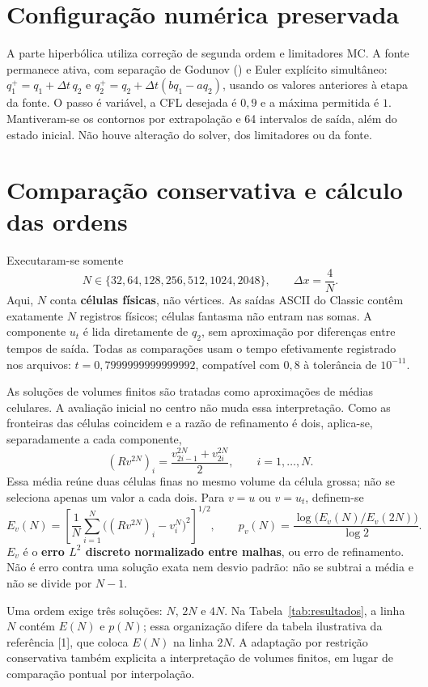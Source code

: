 \documentclass[11pt,a4paper]{article}
\newcommand{\secao}[1]{\section{\texorpdfstring{\color{azul}#1}{#1}}}
\newcommand{\arquivo}[1]{\texttt{\detokenize{#1}}}
\begin{document}
\secao{Configuração numérica preservada}
A parte hiperbólica utiliza correção de segunda ordem e limitadores MC. A fonte
permanece ativa, com separação de Godunov (\arquivo{source_split=1}) e Euler
explícito simultâneo: $q_1^+=q_1+\Delta t\,q_2$ e
$q_2^+=q_2+\Delta t(bq_1-aq_2)$, usando os valores anteriores à etapa da fonte.
O passo é variável, a CFL desejada é $0{,}9$ e a máxima permitida é $1$.
Mantiveram-se os contornos por extrapolação e 64 intervalos de saída, além do
estado inicial. Não houve alteração do solver, dos limitadores ou da fonte.

\newpage
\secao{Comparação conservativa e cálculo das ordens}
Executaram-se somente
\[
 N\in\{32,64,128,256,512,1024,2048\},\qquad \Delta x=\frac{4}{N}.
\]
Aqui, $N$ conta \textbf{células físicas}, não vértices. As saídas ASCII do Classic
contêm exatamente $N$ registros físicos; células fantasma não entram nas somas.
A componente $u_t$ é lida diretamente de $q_2$, sem aproximação por diferenças
entre tempos de saída. Todas as comparações usam o tempo efetivamente registrado
nos arquivos: $t=0{,}7999999999999992$, compatível com $0{,}8$ à tolerância
de $10^{-11}$.

As soluções de volumes finitos são tratadas como aproximações de médias
celulares. A avaliação inicial no centro não muda essa interpretação. Como as
fronteiras das células coincidem e a razão de refinamento é dois, aplica-se,
separadamente a cada componente,
\begin{equation}
 (R v^{2N})_i=\frac{v^{2N}_{2i-1}+v^{2N}_{2i}}{2},\qquad i=1,\ldots,N.
\end{equation}
Essa média reúne duas células finas no mesmo volume da célula grossa; não se
seleciona apenas um valor a cada dois. Para $v=u$ ou $v=u_t$, definem-se
\begin{equation}
 E_v(N)=\left[\frac1N\sum_{i=1}^N
       \big((Rv^{2N})_i-v^N_i\big)^2\right]^{1/2},\qquad
 p_v(N)=\frac{\log\big(E_v(N)/E_v(2N)\big)}{\log2}.
\end{equation}
$E_v$ é o \textbf{erro $L^2$ discreto normalizado entre malhas}, ou erro de
refinamento. Não é erro contra uma solução exata nem desvio padrão:
não se subtrai a média e não se divide por $N-1$.

Uma ordem exige três soluções: $N$, $2N$ e $4N$. Na Tabela~\ref{tab:resultados},
a linha $N$ contém $E(N)$ e $p(N)$; essa organização difere da tabela ilustrativa
da referência [1], que coloca $E(N)$ na linha $2N$. A adaptação por restrição
conservativa também explicita a interpretação de volumes finitos, em lugar
de comparação pontual por interpolação.
\end{document}
